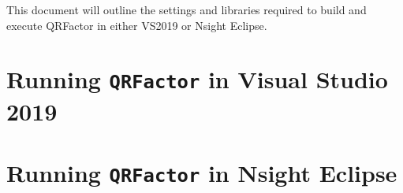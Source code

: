 \documentclass[11pt,letterpaper]{article}
\begin{document}
This document will outline the settings and libraries required to build and execute QRFactor in either VS2019 or Nsight Eclipse.

\section*{Running \texttt{QRFactor} in Visual Studio 2019}




\section*{Running \texttt{QRFactor} in Nsight Eclipse}
\end{document}
